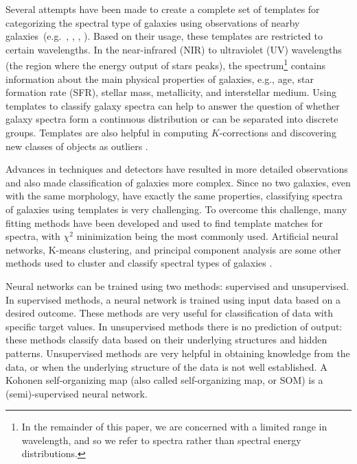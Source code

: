 Several attempts have been made to create a complete set of templates for categorizing the spectral type of galaxies using observations of nearby galaxies~(e.g.~\citealt{Kinney93}, \citealt[][hereafter ]{Kinney96}, \citealt{Bershady00}, \citealt{Mannucci01}). 
Based on their usage, these templates are restricted to certain wavelengths.
In the near-infrared (NIR) to ultraviolet (UV) wavelengths (the region where the energy output of stars peaks), the spectrum\footnote{In the remainder of this paper, we are concerned with a limited range in wavelength, and so we refer to spectra rather than spectral energy distributions.} contains information about the main physical properties of galaxies, e.g., age, star formation rate (SFR), stellar mass, metallicity, and interstellar medium. 
Using templates to classify galaxy spectra can help to answer the question of whether galaxy spectra form a continuous distribution or can  be separated into discrete groups.
Templates are also helpful in computing $K$-corrections and discovering new classes of objects as outliers \citep{Folkes96}.


Advances in techniques and detectors have resulted in more detailed observations and also made classification of galaxies more complex.
Since no two galaxies, even with the same morphology, have exactly the same properties, classifying spectra of galaxies using templates is very challenging.
To overcome this challenge, many fitting methods have been developed and used to find template matches for spectra, with $\chi^2$ minimization being the most commonly used. 
Artificial neural networks, K-means clustering, and principal component analysis are some other methods used to cluster and classify spectral types of galaxies \citep[e.g.][]{Allen13,Ordov14,Shi15}.

Neural networks can be trained using two methods: supervised and unsupervised.
In supervised methods, a neural network is trained using input data based on a desired outcome.
These methods are very useful for classification of data with specific target values.
In unsupervised methods there is no prediction of output:
these methods classify data based on their underlying structures and hidden patterns.
Unsupervised methods are very helpful in obtaining knowledge from the data, or when the underlying structure of the data is not well established.
A Kohonen self-organizing map (also called self-organizing map, or SOM) is a (semi)-supervised neural network.


